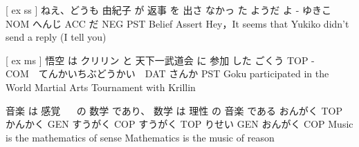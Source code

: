 [ ex ss ]
ねえ、どうも 由紀子 が  返事   を  出さ なかっ た ようだ  よ
-           ゆきこ NOM へんじ ACC  だ   NEG  PST Belief Assert
Hey，It seems that Yukiko didn't send a reply (I tell you)

[ ex ms ]
悟空   は  クリリン と    天下一武道会         に   参加 した
ごくう TOP -　　　　COM　てんかいちぶどうかい　DAT さんか PST
Goku participated in the World Martial Arts Tournament with Krillin

音楽    は   感覚 　 の   数学   であり、 数学  は  理性   の  音楽  である
おんがく TOP かんかく GEN すうがく COP すうがく TOP りせい GEN おんがく COP
Music is the mathematics of sense
Mathematics is the music of reason
